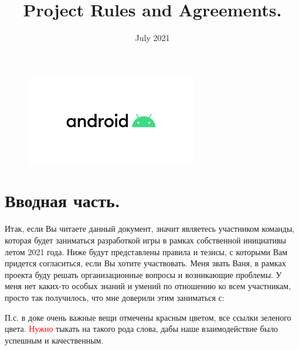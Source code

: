 \documentclass{article}
\date{July 2021}
\title{Project Rules and Agreements.}
\author{}
\begin{document}
\maketitle
\begin{figure}[H]
    \centering
    \includegraphics[width=75mm]{Pictures/android_logo.jpg}
\end{figure}

\newpage

\section{Вводная часть.}

Итак, если Вы читаете данный документ, значит являетесь участником команды, которая будет заниматься разработкой игры в рамках собственной инициативы летом 2021 года. Ниже будут представлены правила и тезисы, с которыми Вам придется согласиться, если Вы хотите участвовать. Меня звать Ваня, в рамках проекта буду решать организационные вопросы и возникающие проблемы. У меня нет каких-то особых знаний и умений по отношению ко всем участникам, просто так получилось, что мне доверили этим заниматься с: 


\noindent\newline П.с. в доке очень важные вещи отмечены красным цветом, все ссылки зеленого цвета. \textcolor{red}{Нужно} тыкать на такого рода слова, дабы наше взаимодействие было успешным и качественным.
\end{document}
